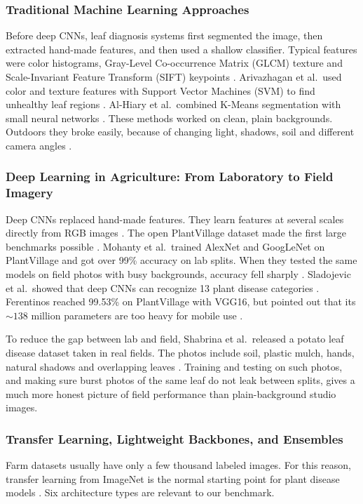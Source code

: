 \subsubsection{Traditional Machine Learning Approaches}
Before deep CNNs, leaf diagnosis systems first segmented the image, then extracted hand-made features, and then used a shallow classifier. Typical features were color histograms, Gray-Level Co-occurrence Matrix (GLCM) texture and Scale-Invariant Feature Transform (SIFT) keypoints \cite{pujari2016image}. Arivazhagan et al.\ used color and texture features with Support Vector Machines (SVM) to find unhealthy leaf regions \cite{arivazhagan2013detection}. Al-Hiary et al.\ combined K-Means segmentation with small neural networks \cite{alhiary2011fast}. These methods worked on clean, plain backgrounds. Outdoors they broke easily, because of changing light, shadows, soil and different camera angles \cite{ngugi2021recent}.

\subsubsection{Deep Learning in Agriculture: From Laboratory to Field Imagery}
Deep CNNs replaced hand-made features. They learn features at several scales directly from RGB images \cite{lecun2015deep, mohanty2016using}. The open PlantVillage dataset made the first large benchmarks possible \cite{hughes2015open}. Mohanty et al.\ trained AlexNet and GoogLeNet on PlantVillage and got over 99\% accuracy on lab splits. When they tested the same models on field photos with busy backgrounds, accuracy fell sharply \cite{mohanty2016using}. Sladojevic et al.\ showed that deep CNNs can recognize 13 plant disease categories \cite{sladojevic2016deep}. Ferentinos reached 99.53\% on PlantVillage with VGG16, but pointed out that its $\sim 138$ million parameters are too heavy for mobile use \cite{ferentinos2018deep}.

To reduce the gap between lab and field, Shabrina et al.\ released a potato leaf disease dataset taken in real fields. The photos include soil, plastic mulch, hands, natural shadows and overlapping leaves \cite{shabrina2024novel}. Training and testing on such photos, and making sure burst photos of the same leaf do not leak between splits, gives a much more honest picture of field performance than plain-background studio images.

\subsubsection{Transfer Learning, Lightweight Backbones, and Ensembles}
Farm datasets usually have only a few thousand labeled images. For this reason, transfer learning from ImageNet is the normal starting point for plant disease models \cite{pan2010survey, too2019comparative}. Six architecture types are relevant to our benchmark.

